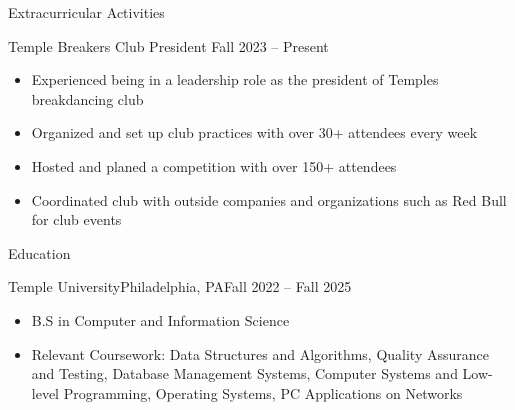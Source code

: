 \documentclass[]{mcdowellcv}
\begin{document}
	
	\begin{cvsection}{Extracurricular Activities}
		\begin{cvsubsection}{Temple Breakers Club President}{}{ Fall 2023 -- Present}	
			\begin{itemize}
				\item Experienced being in a leadership role as the president of Temples breakdancing club
				\item Organized and set up club practices with over 30+ attendees every week
				\item Hosted and planed a competition with over 150+ attendees
				\item Coordinated club with outside companies and organizations such as Red Bull for club events
			\end{itemize}
		\end{cvsubsection}
	\end{cvsection}



	
	

	\begin{cvsection}{Education}
		\begin{cvsubsection}{Temple University}{Philadelphia, PA}{Fall 2022 -- Fall 2025}
			\begin{itemize}
				\item B.S in Computer and Information Science
				\item Relevant Coursework: Data Structures and Algorithms, Quality Assurance and Testing, Database Management Systems, Computer Systems and Low-level Programming, Operating Systems, PC Applications on Networks
			\end{itemize}
		\end{cvsubsection}
	\end{cvsection}
	
\end{document}
